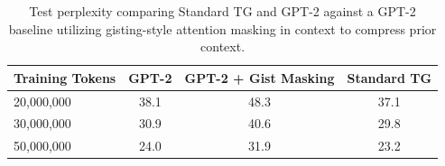 \documentclass{article}
\begin{document}
\begin{table}[H]
    \centering
    \caption{Test perplexity comparing Standard TG and GPT-2 against a GPT-2 baseline utilizing gisting-style attention masking in context \citep{mu2023gisting} to compress prior context.}
    \label{tab:baseline_gisting}
    \vspace{0.2em}
    \begin{tabular}{lccc}
        \toprule
        \textbf{Training Tokens} & \textbf{GPT-2} & \textbf{GPT-2 + Gist Masking} & \textbf{Standard TG} \\
        \midrule
        20,000,000 & 38.1 & 48.3 & 37.1 \\
        30,000,000 & 30.9 & 40.6 & 29.8 \\
        50,000,000 & 24.0 & 31.9 & 23.2 \\
        \bottomrule
    \end{tabular}
\end{table}
\end{document}
